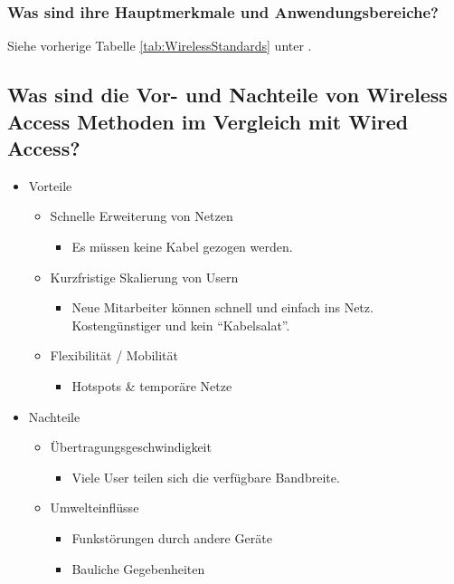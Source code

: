 \subsubsection*{Was sind ihre Hauptmerkmale und Anwendungsbereiche?}
Siehe vorherige Tabelle \ref{tab:WirelessStandards} unter \underline{}.

\subsection*{Was sind die Vor- und Nachteile von \flqq{}Wireless Access\frqq{} Methoden im Vergleich mit \flqq{}Wired Access\frqq?}
\begin{itemize}
    \item Vorteile
    \begin{itemize}
        \item Schnelle Erweiterung von Netzen
        \begin{itemize}
            \item Es müssen keine Kabel gezogen werden.
        \end{itemize}
        \item Kurzfristige Skalierung von Usern
        \begin{itemize}
            \item Neue Mitarbeiter können schnell und einfach ins Netz. Kostengünstiger und kein "`Kabelsalat"'.
        \end{itemize}
        \item Flexibilität / Mobilität
        \begin{itemize}
            \item Hotspots \& temporäre Netze
        \end{itemize}
    \end{itemize}
    \item Nachteile
    \begin{itemize}
        \item Übertragungsgeschwindigkeit
        \begin{itemize}
            \item Viele User teilen sich die verfügbare Bandbreite.
        \end{itemize}
        \item Umwelteinflüsse
        \begin{itemize}
            \item Funkstörungen durch andere Geräte
            \item Bauliche Gegebenheiten

\end{itemize}
\end{itemize}
\end{itemize}
